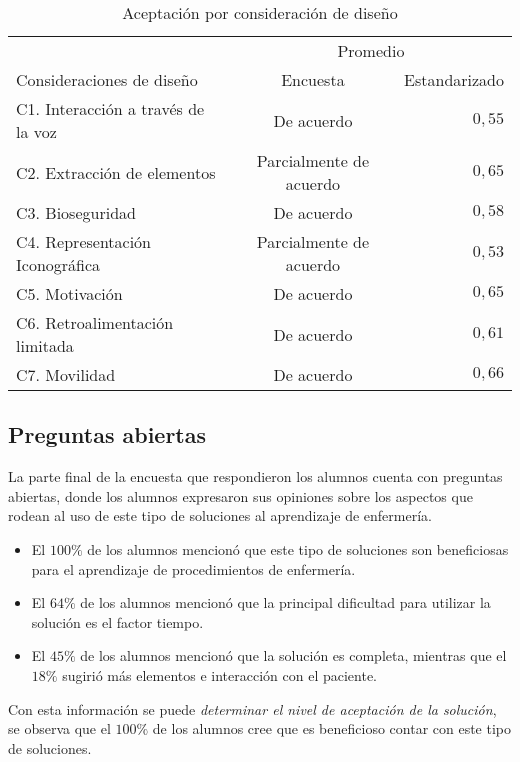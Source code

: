\begin{table}[H]
\centering
\begin{tabular}{lcr}
\toprule
& \multicolumn{2}{c}{Promedio} \\
\cmidrule(lr){2-3}
Consideraciones de diseño          & Encuesta                & Estandarizado \\
\midrule
C1. Interacción a través de la voz & De acuerdo              & $0,55$ \\
C2. Extracción de elementos        & Parcialmente de acuerdo & $0,65$ \\
C3. Bioseguridad                   & De acuerdo              & $0,58$ \\
C4. Representación Iconográfica    & Parcialmente de acuerdo & $0,53$ \\
C5. Motivación                     & De acuerdo              & $0,65$ \\
C6. Retroalimentación limitada     & De acuerdo              & $0,61$ \\
C7. Movilidad                      & De acuerdo              & $0,66$ \\
\bottomrule
\end{tabular}
\caption{Aceptación por consideración de diseño}
\label{tab:resultado_resumen_hipotesis}
\end{table}

\subsection{Preguntas abiertas}
\label{sec:res_subjetiva_abiertas}

La parte final de la encuesta que respondieron los alumnos cuenta con preguntas abiertas, 
donde los alumnos expresaron sus
opiniones sobre los aspectos que rodean al uso de este tipo de soluciones al
aprendizaje de enfermería.


\begin{itemize}
    \item El $100\%$ de los alumnos mencionó que este tipo de soluciones son
        beneficiosas para el aprendizaje de procedimientos de enfermería.
    \item El $64\%$ de los alumnos mencionó que la principal dificultad para
        utilizar la solución es el factor tiempo.
    \item El $45\%$ de los alumnos mencionó que la solución es completa,
        mientras que el $18\%$ sugirió más elementos e interacción con el
        paciente.
\end{itemize}


Con esta información se puede \emph{determinar el nivel de aceptación de la
    solución}, se observa que el $100\%$ de los alumnos cree que es beneficioso
contar con este tipo de soluciones.

